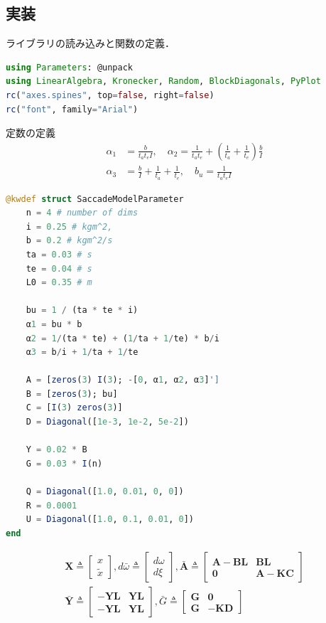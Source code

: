 \subsection{実装}
ライブラリの読み込みと関数の定義．
\begin{lstlisting}[language=julia]
using Parameters: @unpack
using LinearAlgebra, Kronecker, Random, BlockDiagonals, PyPlot
rc("axes.spines", top=false, right=false)
rc("font", family="Arial") 
\end{lstlisting}
定数の定義
\begin{align}
\alpha_{1}&=\frac{b}{t_{a} t_{e} I},\quad \alpha_{2}=\frac{1}{t_{a} t_{e}}+\left(\frac{1}{t_{a}}+\frac{1}{t_{e}}\right) \frac{b}{I} \\
\alpha_{3}&=\frac{b}{I}+\frac{1}{t_{a}}+\frac{1}{t_{e}},\quad b_{u}=\frac{1}{t_{a} t_{e} I}
\end{align}
\begin{lstlisting}[language=julia]
@kwdef struct SaccadeModelParameter
    n = 4 # number of dims
    i = 0.25 # kgm^2, 
    b = 0.2 # kgm^2/s
    ta = 0.03 # s
    te = 0.04 # s
    L0 = 0.35 # m

    bu = 1 / (ta * te * i)
    α1 = bu * b
    α2 = 1/(ta * te) + (1/ta + 1/te) * b/i
    α3 = b/i + 1/ta + 1/te

    A = [zeros(3) I(3); -[0, α1, α2, α3]']
    B = [zeros(3); bu]
    C = [I(3) zeros(3)]
    D = Diagonal([1e-3, 1e-2, 5e-2])

    Y = 0.02 * B
    G = 0.03 * I(n)

    Q = Diagonal([1.0, 0.01, 0, 0]) 
    R = 0.0001
    U = Diagonal([1.0, 0.1, 0.01, 0])
end
\end{lstlisting}
\begin{align}
\mathbf{X}\triangleq\begin{bmatrix}
x \\
\tilde{x}
\end{bmatrix}, d \bar{\omega} \triangleq\begin{bmatrix}
d \omega \\
d \xi
\end{bmatrix}, \bar{\mathbf{A}} \triangleq\begin{bmatrix}
\mathbf{A}-\mathbf{B} \mathbf{L} & \mathbf{B} \mathbf{L} \\
\mathbf{0} & \mathbf{A}-\mathbf{K} \mathbf{C}
\end{bmatrix}\\
\bar{\mathbf{Y}} \triangleq\begin{bmatrix}
-\mathbf{Y} \mathbf{L} & \mathbf{Y} \mathbf{L} \\
-\mathbf{Y} \mathbf{L} & \mathbf{Y} \mathbf{L}
\end{bmatrix}, \bar{G} \triangleq\begin{bmatrix}
\mathbf{G} & \mathbf{0} \\
\mathbf{G} & -\mathbf{K} \mathbf{D}
\end{bmatrix}
\end{align}
